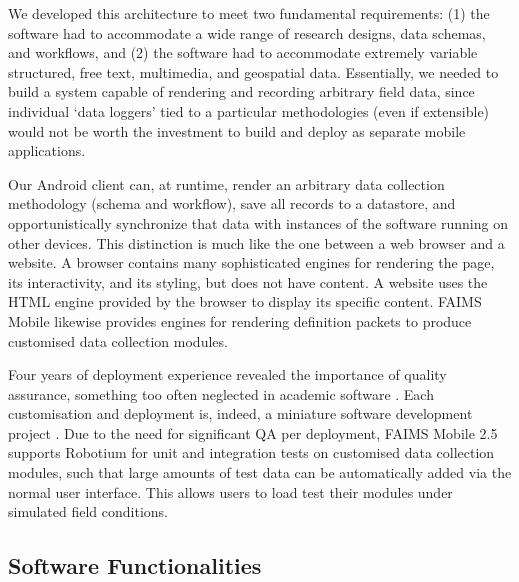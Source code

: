 \documentclass[preprint,12pt, a4paper]{elsarticle}
\begin{document}
We developed this architecture to meet two fundamental requirements: (1) the software had to accommodate a wide range of research designs, data schemas, and workflows, and (2) the software had to accommodate extremely variable structured, free text, multimedia, and geospatial data. Essentially, we needed to build a system capable of rendering and recording arbitrary field data, since individual `data loggers' tied to a particular methodologies (even if extensible) would not be worth the investment to build and deploy as separate mobile applications. 

Our Android client can, at runtime, render an arbitrary data collection methodology (schema and workflow), save all records to a datastore, and opportunistically synchronize that data with instances of the software running on other devices. This distinction is much like the one between a web browser and a website. A browser contains many sophisticated engines for rendering the page, its interactivity, and its styling, but does not have content. A website uses the HTML engine provided by the browser to display its specific content. FAIMS Mobile likewise provides engines for rendering definition packets to produce customised data collection modules. 

Four years of deployment experience revealed the importance of quality assurance, something too often neglected in academic software \cite{Might2010-fo, Sun2012-ub}. Each customisation and deployment is, indeed, a miniature software development project \cite{Sobotkova2016-mx}. Due to the need for significant QA per deployment, FAIMS Mobile 2.5 supports Robotium for unit and integration tests on customised data collection modules, such that large amounts of test data can be automatically added via the normal user interface. This allows users to load test their modules under simulated field conditions. 

\subsection{Software Functionalities}
\end{document}
